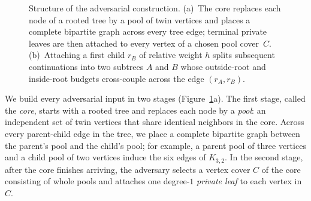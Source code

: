 \documentclass[11pt,letterpaper]{article}
\begin{document}
\begin{figure}[!ht]
\caption{Structure of the adversarial construction. (a)~The core replaces each node of a rooted tree by a pool of twin vertices and places a complete bipartite graph across every tree edge; terminal private leaves are then attached to every vertex of a chosen pool cover~$C$. (b)~Attaching a first child $r_B$ of relative weight $h$ splits subsequent continuations into two subtrees $A$ and $B$ whose outside-root and inside-root budgets cross-couple across the edge $(r_A,r_B)$.}
\label{fig:overview}
\end{figure}

We build every adversarial input in two stages (Figure~\ref{fig:overview}a). The first stage, called the \emph{core}, starts with a rooted tree and replaces each node by a \emph{pool}: an independent set of twin vertices that share identical neighbors in the core. Across every parent-child edge in the tree, we place a complete bipartite graph between the parent's pool and the child's pool; for example, a parent pool of three vertices and a child pool of two vertices induce the six edges of $K_{3,2}$. In the second stage, after the core finishes arriving, the adversary selects a vertex cover $C$ of the core consisting of whole pools and attaches one degree-$1$ \emph{private leaf} to each vertex in $C$.
\end{document}
